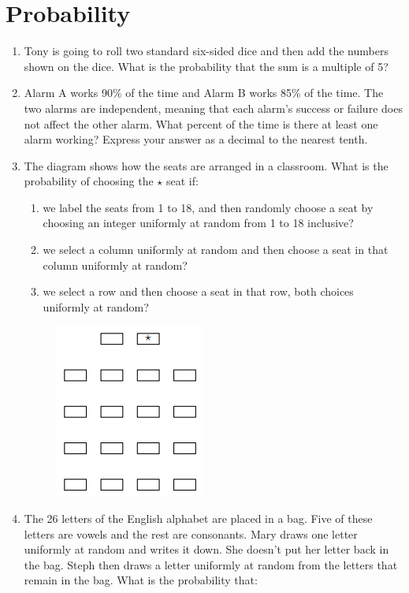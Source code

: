 \documentclass{article}
\begin{document}
\section*{Probability}

\begin{enumerate}
\item Tony is going to roll two standard six-sided dice and then add the numbers shown on the dice. What is the probability that the sum is a multiple of 5?\vspace{1cm}
\item Alarm A works 90\% of the time and Alarm B works 85\% of the time. The two alarms are independent, meaning that each alarm's success or failure does not affect the other alarm. What percent of the time is there at least one alarm working? Express your answer as a decimal to the nearest tenth.\vspace{1cm}
\item The diagram shows how the seats are arranged in a classroom. What is the probability of choosing the $\star$ seat if:
\begin{enumerate}
\item we label the seats from 1 to 18, and then randomly choose a seat by choosing an integer uniformly at random from 1 to 18 inclusive?
\item we select a column uniformly at random and then choose a seat in that column uniformly at random?
\item we select a row and then choose a seat in that row, both choices uniformly at random?
\end{enumerate}
\begin{figure}[H]
\centering
\includegraphics[scale=0.5]{desks.png}
\end{figure}
\item The 26 letters of the English alphabet are placed in a bag. Five of these letters are vowels and the rest are consonants. Mary draws one letter uniformly at random and writes it down. She doesn't put her letter back in the bag. Steph then draws a letter uniformly at random from the letters that remain in the bag. What is the probability that:

\end{enumerate}
\end{document}
